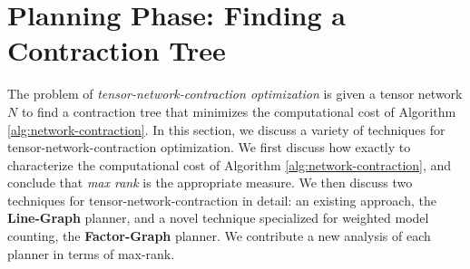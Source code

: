 \section{Planning Phase: Finding a Contraction Tree}
\label{sec:tensors:planning}
The problem of \emph{tensor-network-contraction optimization} is given a tensor network $N$ to find a contraction tree that minimizes the computational cost of Algorithm \ref{alg:network-contraction}. 
In this section, we discuss a variety of techniques for tensor-network-contraction optimization. 
We first discuss how exactly to characterize the computational cost of Algorithm \ref{alg:network-contraction}, and conclude that \emph{max rank} is the appropriate measure. 
We then discuss two techniques for tensor-network-contraction in detail: an existing approach, the \textbf{Line-Graph} planner, and a novel technique specialized for weighted model counting, the \textbf{Factor-Graph} planner. We contribute a new analysis of each planner in terms of max-rank.






